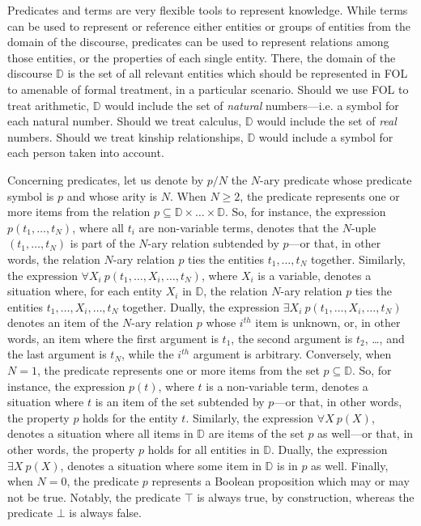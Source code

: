 \documentclass[12pt,a4paper,openright,twoside]{book}
\begin{document}
Predicates and terms are very flexible tools to represent knowledge.
%
While terms can be used to represent or reference either entities or groups of entities from the domain of the discourse, predicates can be used to represent relations among those entities, or the properties of each single entity.
%
There, the domain of the discourse $\mathbb{D}$ \cite{blackburn2008oxford} is the set of all relevant entities which should be represented in FOL to amenable of formal treatment, in a particular scenario.
%
Should we use FOL to treat arithmetic, $\mathbb{D}$ would include the set of \emph{natural} numbers---i.e. a symbol for each natural number.
%
Should we treat calculus, $\mathbb{D}$ would include the set of \emph{real} numbers.
%
Should we treat kinship relationships, $\mathbb{D}$ would include a symbol for each person taken into account.

Concerning predicates, let us denote by $p/N$ the $N$-ary predicate whose predicate symbol is $p$ and whose arity is $N$.
%
%
When $N \geq 2$, the predicate represents one or more items from the relation $p \subseteq \mathbb{D} \times \ldots \times \mathbb{D}$.
%
So, for instance, the expression $p(t_1, \ldots, t_N)$, where all $t_i$ are non-variable terms, denotes that the $N$-uple $(t_1, \ldots, t_N)$ is part of the $N$-ary relation subtended by $p$---or that, in other words, the relation $N$-ary relation $p$ ties the entities $t_1, \ldots, t_N$ together.
%
Similarly, the expression $\forall X_i\ p(t_1, \ldots, X_i, \ldots, t_N)$, where $X_i$ is a variable, denotes a situation where, for each entity $X_i$ in $\mathbb{D}$, the relation $N$-ary relation $p$ ties the entities $t_1, \ldots, X_i, \ldots, t_N$ together.
%
Dually, the expression $\exists X_i\ p(t_1, \ldots, X_i, \ldots, t_N)$ denotes an item of the $N$-ary relation $p$ whose $i^{th}$ item is unknown, or, in other words, an item where the first argument is $t_1$, the second argument is $t_2$, \ldots, and the last argument is $t_N$, while the $i^{th}$ argument is arbitrary.
%
Conversely, when $N = 1$, the predicate represents one or more items from the set $p \subseteq \mathbb{D}$.
%
So, for instance, the expression $p(t)$, where $t$ is a non-variable term, denotes a situation where $t$ is an item of the set subtended by $p$---or that, in other words, the property $p$ holds for the entity $t$.
%
Similarly, the expression $\forall X\ p(X)$, denotes a situation where all items in $\mathbb{D}$ are items of the set $p$ as well---or that, in other words, the property $p$ holds for all entities in $\mathbb{D}$.
%
Dually, the expression $\exists X\ p(X)$, denotes a situation where some item in $\mathbb{D}$ is in $p$ as well.
%
Finally, when $N = 0$, the predicate $p$ represents a Boolean proposition which may or may not be true.
%
Notably, the predicate $\top$ is always true, by construction, whereas the predicate $\bot$ is always false.
\end{document}
